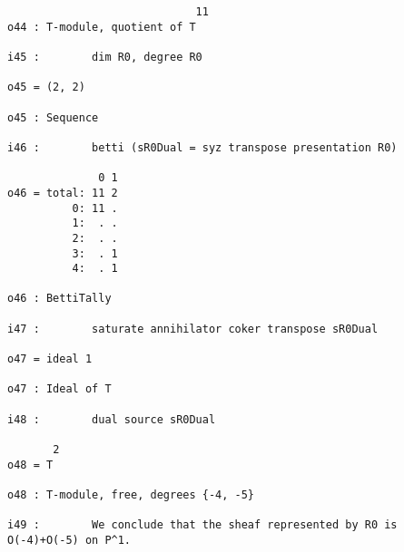\documentclass[twoside,12pt, leqno]{amsart}
\begin{document}
\begin{verbatim}
                             11
o44 : T-module, quotient of T

i45 :        dim R0, degree R0

o45 = (2, 2)

o45 : Sequence

i46 :        betti (sR0Dual = syz transpose presentation R0)

              0 1
o46 = total: 11 2
          0: 11 .
          1:  . .
          2:  . .
          3:  . 1
          4:  . 1

o46 : BettiTally

i47 :        saturate annihilator coker transpose sR0Dual

o47 = ideal 1

o47 : Ideal of T

i48 :        dual source sR0Dual       

       2
o48 = T

o48 : T-module, free, degrees {-4, -5}

i49 :        We conclude that the sheaf represented by R0 is O(-4)+O(-5) on P^1. 
\end{verbatim}
\end{document}
